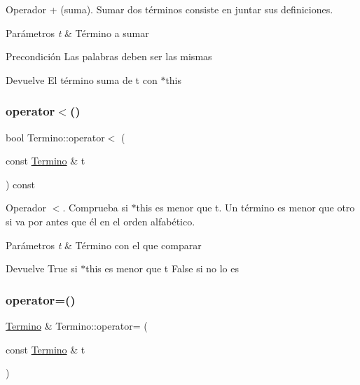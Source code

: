 Operador + (suma). Sumar dos términos consiste en juntar sus definiciones. 


\begin{DoxyParams}{Parámetros}
{\em t} & Término a sumar \\
\hline
\end{DoxyParams}
\begin{DoxyPrecond}{Precondición}
Las palabras deben ser las mismas 
\end{DoxyPrecond}
\begin{DoxyReturn}{Devuelve}
El término suma de t con $\ast$this 
\end{DoxyReturn}
\mbox{\label{classTermino_a2674fda8a9f8f9e40ba338953e3e94ae}} 
\subsubsection{\texorpdfstring{operator$<$()}{operator<()}}
{\footnotesize\ttfamily bool Termino\+::operator$<$ (\begin{DoxyParamCaption}\item[{const \mbox{\hyperlink{classTermino}{Termino}} \&}]{t }\end{DoxyParamCaption}) const}



Operador $<$. Comprueba si $\ast$this es menor que t. Un término es menor que otro si va por antes que él en el orden alfabético. 


\begin{DoxyParams}{Parámetros}
{\em t} & Término con el que comparar \\
\hline
\end{DoxyParams}
\begin{DoxyReturn}{Devuelve}
True si $\ast$this es menor que t False si no lo es 
\end{DoxyReturn}
\mbox{\label{classTermino_a7ef9a9aed0e1cf3f1ae098be760946f0}} 
\subsubsection{\texorpdfstring{operator=()}{operator=()}}
{\footnotesize\ttfamily \mbox{\hyperlink{classTermino}{Termino}} \& Termino\+::operator= (\begin{DoxyParamCaption}\item[{const \mbox{\hyperlink{classTermino}{Termino}} \&}]{t }\end{DoxyParamCaption})}



